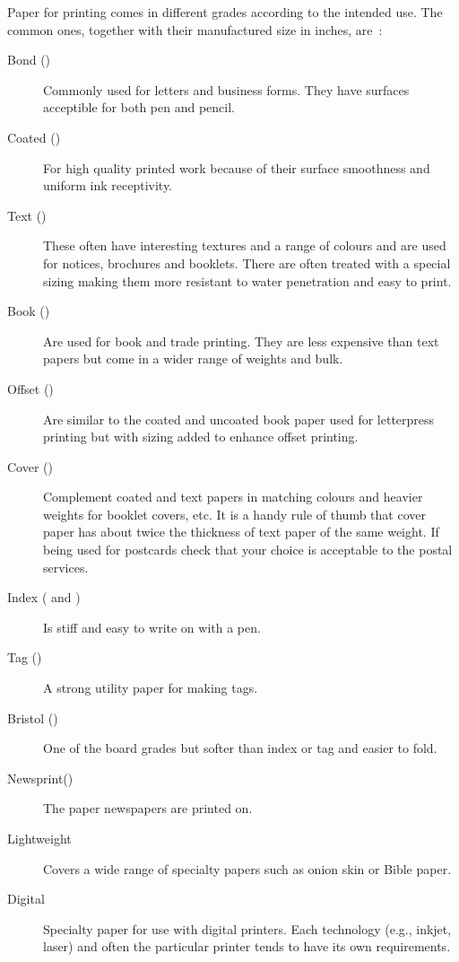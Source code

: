 \documentclass[10pt,letterpaper,extrafontsizes]{memoir}
\begin{document}
    Paper for printing comes in different grades according to the intended 
use. The common ones, together with their manufactured size in inches, 
are~\autocite{POCKETPAL}:
\begin{description}
\item[Bond ()] Commonly used for letters and
business forms. They have surfaces acceptible for both pen and pencil.

\item[Coated ()] For high quality printed
work because of their surface smoothness and uniform ink receptivity.

\item[Text ()] These often have interesting 
textures and a range of colours and are used for notices, brochures and 
booklets. There are often treated with a special sizing making them more
resistant to water penetration and easy to print.

\item[Book ()] Are used for book and trade 
printing. They are less expensive than text papers but come in a wider range
of weights and bulk.

\item[Offset ()] Are similar to the coated and
uncoated book paper used for letterpress printing but with sizing added to
enhance offset printing.

\item[Cover ()] Complement coated and text
papers in matching colours and heavier weights for booklet covers, etc. It is
a handy rule of thumb that cover paper has about twice the thickness of text
paper of the same weight. If being used for postcards check that your choice 
is acceptable to the postal services.

\item[Index ( and )] Is 
stiff and easy to write on with a pen.

\item[Tag  ()] A strong utility paper for making
tags.

\item[Bristol ()] One of the board grades
but softer than index or tag and easier to fold.

\item[Newsprint()] The paper newspapers 
are printed on.

\item[Lightweight] Covers a wide range of
specialty papers such as onion skin or Bible paper.

\item[Digital] Specialty paper for use with
digital printers. Each technology (e.g., inkjet, laser) and often 
the particular printer tends to have its own requirements.
\end{description}
\end{document}
